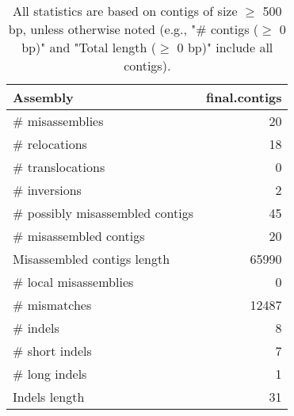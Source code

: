 \documentclass[12pt,a4paper]{article}
\begin{document}
\begin{table}[ht]
\begin{center}
\caption{All statistics are based on contigs of size $\geq$ 500 bp, unless otherwise noted (e.g., "\# contigs ($\geq$ 0 bp)" and "Total length ($\geq$ 0 bp)" include all contigs).}
\begin{tabular}{|l*{1}{|r}|}
\hline
Assembly & final.contigs \\ \hline
\# misassemblies & 20 \\ \hline
\hspace{5mm}\# relocations & 18 \\ \hline
\hspace{5mm}\# translocations & 0 \\ \hline
\hspace{5mm}\# inversions & 2 \\ \hline
\# possibly misassembled contigs & 45 \\ \hline
\# misassembled contigs & 20 \\ \hline
Misassembled contigs length & 65990 \\ \hline
\# local misassemblies & 0 \\ \hline
\# mismatches & 12487 \\ \hline
\# indels & 8 \\ \hline
\hspace{5mm}\# short indels & 7 \\ \hline
\hspace{5mm}\# long indels & 1 \\ \hline
Indels length & 31 \\ \hline
\end{tabular}
\end{center}
\end{table}
\end{document}
